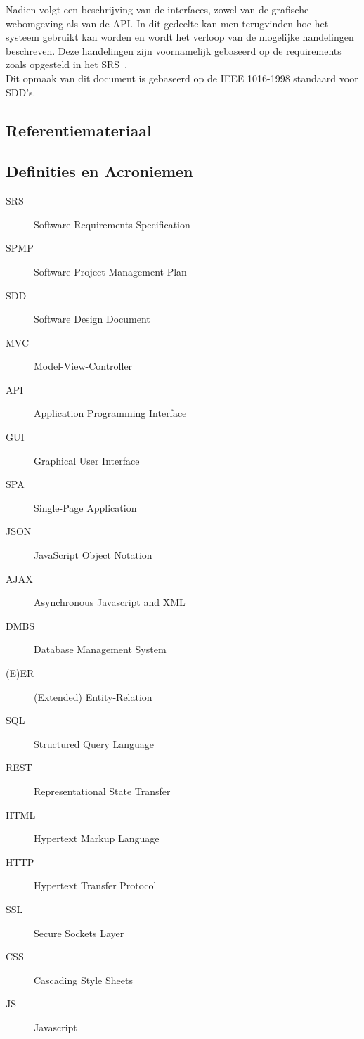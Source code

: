 \documentclass{article}
\begin{document}
Nadien volgt een beschrijving van de interfaces, zowel van de grafische webomgeving als van de API. In dit gedeelte kan men terugvinden hoe het systeem gebruikt kan worden en wordt het verloop van de mogelijke handelingen beschreven. Deze handelingen zijn voornamelijk gebaseerd op de requirements zoals opgesteld in het SRS~\cite{Xtreport:SRS}. \\

Dit opmaak van dit document is gebaseerd op de IEEE 1016-1998 standaard voor SDD's\citep{website:IEEE}.

\subsection{Referentiemateriaal}
\begingroup
\renewcommand{\section}[2]{}  %

\endgroup
 
\subsection{Definities en Acroniemen}

\begin{description}

\item[SRS] Software Requirements Specification
\item[SPMP] Software Project Management Plan
\item[SDD] Software Design Document
\item[MVC] Model-View-Controller
\item[API] Application Programming Interface
\item[GUI] Graphical User Interface
\item[SPA] Single-Page Application
\item[JSON] JavaScript Object Notation
\item[AJAX] Asynchronous Javascript and XML
\item[DMBS] Database Management System
\item[(E)ER] (Extended) Entity-Relation
\item[SQL] Structured Query Language
\item[REST] Representational State Transfer
\item[HTML] Hypertext Markup Language
\item[HTTP] Hypertext Transfer Protocol
\item[SSL] Secure Sockets Layer
\item[CSS] Cascading Style Sheets
\item[JS] Javascript

\end{description}
\end{document}

